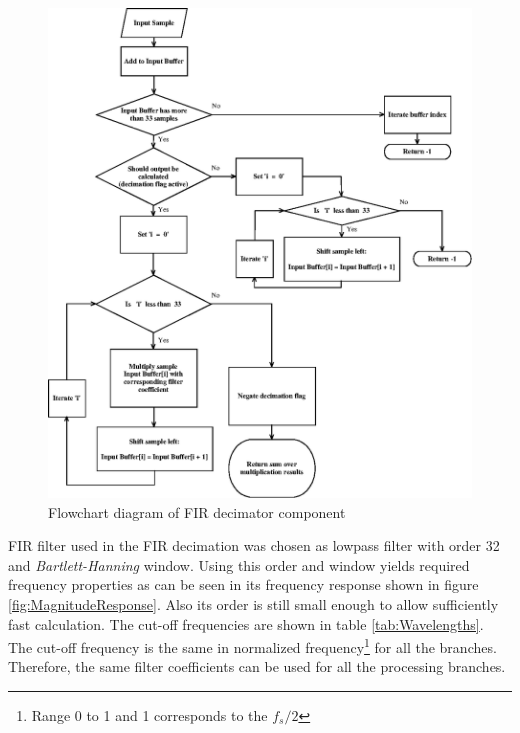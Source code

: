 \documentclass[twoside]{ctuthesis}
\theoremstyle{plain}
\theoremstyle{definition}
\theoremstyle{note}
\begin{document}
\begin{figure}[h]
	\centering
	\includegraphics[width=1.0\textwidth]{firDecimator.eps}
	\caption{Flowchart diagram of FIR decimator component}
	\label{fig:FIR_decimator}
\end{figure}
FIR filter used in the FIR decimation was chosen as lowpass filter with order 32 and \textit{Bartlett-Hanning} window. Using this order and window yields required frequency properties as can be seen in its frequency response shown in figure \ref{fig:MagnitudeResponse}. Also its order is still small enough to allow sufficiently fast calculation. The cut-off frequencies are shown in table \ref{tab:Wavelengths}. The cut-off frequency is the same in normalized frequency\footnote{Range 0 to 1 and 1 corresponds to the $f_s/2$} for all the branches. Therefore, the same filter coefficients can be used for all the processing branches.
\end{document}
